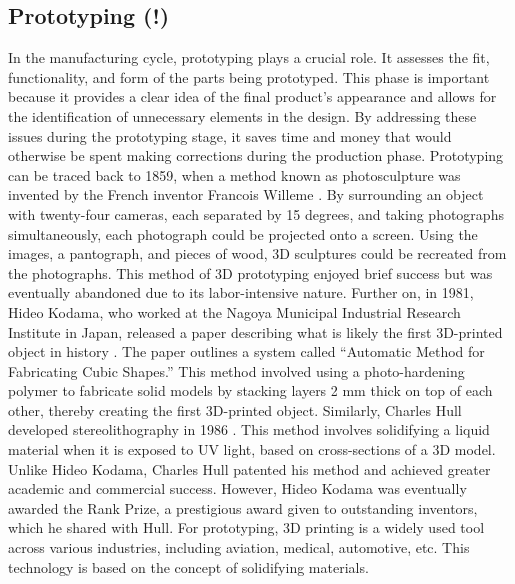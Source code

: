 
\subsection{Prototyping (!)}
In the manufacturing cycle, prototyping plays a crucial role. It assesses the fit, functionality,
and form of the parts being prototyped. This phase is important because it provides a clear idea of 
the final product's appearance and allows for the identification of unnecessary elements in the design. 
By addressing these issues during the prototyping stage, it saves time and money that would otherwise be 
spent making corrections during the production phase.
\newline \newline
Prototyping can be traced back to 1859, when a method known as photosculpture was invented by 
the French inventor Francois Willeme \cite{Lengua2017}. By surrounding an object with twenty-four 
cameras, each separated by 15 degrees, and taking photographs simultaneously, each photograph could 
be projected onto a screen. Using the images, a pantograph, and pieces of wood, 3D sculptures could 
be recreated from the photographs. This method of 3D prototyping enjoyed brief success but was eventually 
abandoned due to its labor-intensive nature.
\newline \newline
Further on, in 1981, Hideo Kodama, who worked at the Nagoya Municipal Industrial Research 
Institute in Japan, released a paper describing what is likely the first 3D-printed object 
in history \cite{Lengua2017}. The paper outlines a system called ``Automatic Method for Fabricating 
Cubic Shapes.'' This method involved using a photo-hardening polymer to fabricate solid models by 
stacking layers 2 mm thick on top of each other, thereby creating the first 3D-printed object. 
Similarly, Charles Hull developed stereolithography in 1986 \cite{SU20181}. This method involves 
solidifying a liquid material when it is exposed to UV light, based on cross-sections of a 3D model.
Unlike Hideo Kodama, Charles Hull patented his method and achieved greater academic and commercial 
success. However, Hideo Kodama was eventually awarded the Rank Prize, a prestigious award given to 
outstanding inventors, which he shared with Hull.
\newline \newline
For prototyping, 3D printing is a widely used tool across various industries, including aviation,
medical, automotive, etc. This technology is based on the concept of solidifying materials. 
